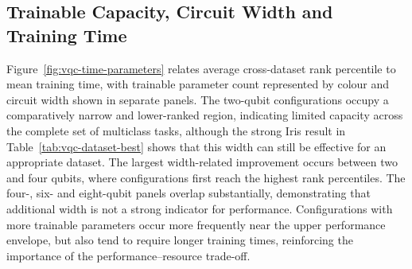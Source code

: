 \documentclass[]{UCD_CS_MSc_AAI_Report}
\begin{document}
\begin{table}[htb]
    \centering
    \small
    \caption{Best \ac{vqc} performance on each main dataset compared with the stronger classical reference.}
    \label{tab:vqc-dataset-best}
\end{table}

\subsection{Trainable Capacity, Circuit Width and Training Time}
\label{subsec:vqc-capacity-time}

Figure~\ref{fig:vqc-time-parameters} relates average cross-dataset rank percentile to mean training time, with trainable parameter count represented by colour and circuit width shown in separate panels. The two-qubit configurations occupy a comparatively narrow and lower-ranked region, indicating limited capacity across the complete set of multiclass tasks, although the strong Iris result in Table~\ref{tab:vqc-dataset-best} shows that this width can still be effective for an appropriate dataset. The largest width-related improvement occurs between two and four qubits, where configurations first reach the highest rank percentiles. The four-, six- and eight-qubit panels overlap substantially, demonstrating that additional width is not a strong indicator for performance. Configurations with more trainable parameters occur more frequently near the upper performance envelope, but also tend to require longer training times, reinforcing the importance of the performance--resource trade-off.
\end{document}

